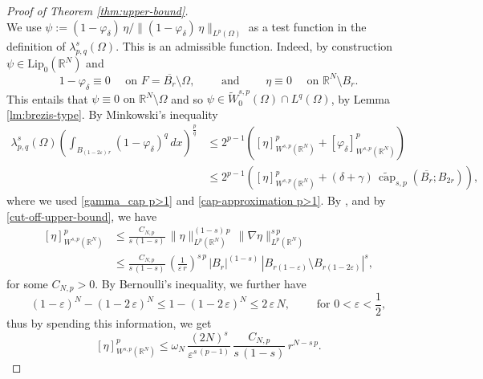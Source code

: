 \documentclass{amsart}
\theoremstyle{definition}
\numberwithin{equation}{section}
\begin{document}
\begin{proof}[Proof of Theorem \ref{thm:upper-bound}]
\begin{equation}
	\end{equation}
	We use $\psi := (1-\varphi_\delta)\,\eta/ \|(1-\varphi_\delta)\,\eta\|_{L^p(\Omega)}$ as a test function in the definition of $\lambda^s_{p, q}(\Omega)$. This is an admissible function. Indeed, by construction $\psi \in \mathrm{Lip}_0(\mathbb{R}^N)$ and \[
	1 - \varphi_\delta \equiv 0 \quad \mbox{ on } F = \overline{B_r} \setminus \Omega, \qquad \mbox{ and } \qquad \eta \equiv 0 \quad \mbox{ on } \mathbb{R}^N \setminus B_r.
	\]
	This entails that
	$
	\psi \equiv 0 \mbox{ on } \mathbb{R}^N \setminus \Omega
	$
	and so $\psi \in \widetilde{W}^{s,p}_0(\Omega) \cap L^q(\Omega)$, by Lemma \ref{lm:brezis-type}.
	By Minkowski's inequality
	\begin{equation} 
		\label{test+leibniz p>1}
		\begin{split}
			\lambda^s_{p, q}(\Omega)  \left(\int_{B_{(1-2\varepsilon)\,r}}(1-\varphi_\delta)^q\,dx \right)^{\frac{p}{q}} &\le 2^{p-1} \left([\eta]^p_{W^{s,p}(\mathbb{R}^N)} + [\varphi_{\delta}]^p_{W^{s,p}(\mathbb{R}^N)}  \right)\\
			&\le  2^{p-1}\left([\eta]^p_{W^{s,p}(\mathbb{R}^N)} + (\delta+\gamma)\,\widetilde{\operatorname{cap}}_{s,p}\left(\overline{B_r};B_{2r}\right)\right),
		\end{split}
	\end{equation}
	where we used \eqref{gamma_cap p>1} and \eqref{cap-approximation p>1}. 
	By \cite[Corollary 2.2]{BPS}, \cite[Proposition 4.2]{BLP} and by \eqref{cut-off-upper-bound}, we have
	\begin{equation*} \label{norm-split p>1}
		\begin{split} 
			[\eta]_{W^{s, p}(\mathbb{R}^N)}^p &\leq \frac{C_{N,p}}{s\,(1-s)}\,\|\eta\|_{L^p(\mathbb{R}^N)}^{(1-s)\,p}\,\|\nabla \eta\|_{L^p(\mathbb{R}^N)}^{s\,p}\\
			&\leq \frac{C_{N,p}}{s\,(1-s)}\,\left(\frac{1}{\varepsilon\,r}\right)^{s\,p}\,|B_r|^{(1-s)}\,|B_{r(1-\varepsilon)}\setminus B_{r(1-2\varepsilon)}|^{s},
		\end{split}
	\end{equation*}
	for some $C_{N,p} > 0$. By Bernoulli's inequality, we further have 
	\begin{equation} \label{bernoulli}
		(1-\varepsilon)^N - (1-2\,\varepsilon)^N \le 1 - \left(1-2\,\varepsilon\right)^N \le 2\,\varepsilon\,N, \qquad \mbox{ for } 0 < \varepsilon < \frac{1}{2},
	\end{equation}
	thus by spending this information, we get
	\[
	[\eta]^p_{W^{s,p}(\mathbb{R}^N)} \leq  \omega_N\, \frac{(2N)^s}{\varepsilon^{s\,(p-1)}}\,\frac{C_{N, p}}{s\,(1-s)}\,r^{N-s\,p}.
\]
\end{proof}
\end{document}
